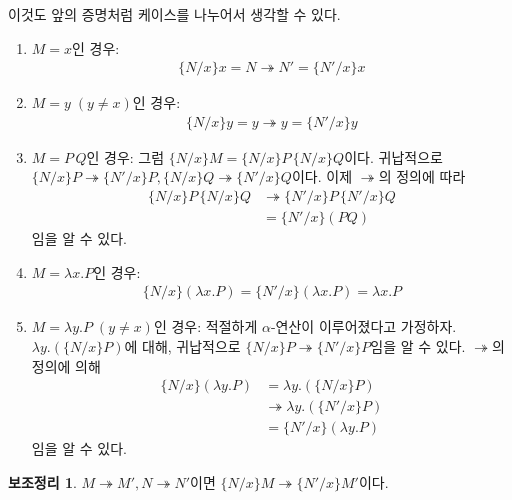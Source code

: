 \documentclass[b5paper]{book}
\theoremstyle{definition}
\newtheorem{lem}{보조정리}[chapter]
\newenvironment{pf*}{\pushQED{\qed}\pf}{\popQED\endpf}
\begin{document}
\begin{pf*} 
    이것도 앞의 증명처럼 케이스를 나누어서 생각할 수 있다.
    \begin{enumerate}
        \item $M = x$인 경우: 
        \begin{align*}
            \{N / x\} x = N \twoheadrightarrow N' = \{N' / x\} x
        \end{align*}
        \item $M = y\; (y \neq x)$인 경우:
        \begin{align*}
            \{N / x\} y = y \twoheadrightarrow y = \{N' / x\} y
        \end{align*}
        \item $M = P \, Q$인 경우:
        그럼 $\{N /x \} M = \{N /x \} P \, \{N /x \} Q $이다. 귀납적으로 $\{N /x \} P 
        \twoheadrightarrow \{N' /x\} P,\{N /x \} Q \twoheadrightarrow \{N' /x \} Q $이다.
        이제 $\twoheadrightarrow$의 정의에 따라 
        \begin{align*}
            \{N /x \} P \, \{N /x \} Q &\twoheadrightarrow \{N' / x \} P \, \{N' /x \} Q \\
            &= \{N' / x\} (PQ)    
        \end{align*}
        임을 알 수 있다.
        \item $M = \lambda x. P$인 경우: 
        \begin{align*}
            \{N / x\} (\lambda x. P) = \{N' / x \} (\lambda x.P) = \lambda x. P
        \end{align*}
        \item $M = \lambda y. P \; (y \neq x)$인 경우: 적절하게 $\alpha$-연산이 이루어졌다고
        가정하자. $\lambda y. (\{N / x\} P)$에 대해, 귀납적으로 $\{N / x\} P \twoheadrightarrow \{N' / x \} P$임을
        알 수 있다. $\twoheadrightarrow$의 정의에 의해
        \begin{align*}
            \{N / x\} (\lambda y. P)& = \lambda y. (\{N /x\} P) \\ 
            &\twoheadrightarrow \lambda y. (\{ N' / x \} P) \\
            &= \{N' / x\} (\lambda y. P)
        \end{align*}
        임을 알 수 있다.
    \end{enumerate}
\end{pf*}
\begin{lem}
    $M \twoheadrightarrow M', N \twoheadrightarrow N'$이면
    $\{N / x \} M \twoheadrightarrow \{ N' / x \} M'$이다.
\end{lem}
\end{document}
